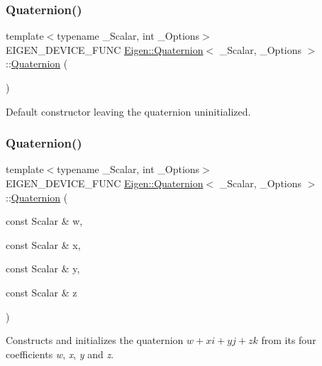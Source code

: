 \subsubsection{\texorpdfstring{Quaternion()}{Quaternion()}\hspace{0.1cm}{\footnotesize\ttfamily [1/7]}}
{\footnotesize\ttfamily template$<$typename \+\_\+\+Scalar, int \+\_\+\+Options$>$ \\
E\+I\+G\+E\+N\+\_\+\+D\+E\+V\+I\+C\+E\+\_\+\+F\+U\+NC \mbox{\hyperlink{class_eigen_1_1_quaternion}{Eigen\+::\+Quaternion}}$<$ \+\_\+\+Scalar, \+\_\+\+Options $>$\+::\mbox{\hyperlink{class_eigen_1_1_quaternion}{Quaternion}} (\begin{DoxyParamCaption}{ }\end{DoxyParamCaption})\hspace{0.3cm}{\ttfamily [inline]}}

Default constructor leaving the quaternion uninitialized. \mbox{\label{class_eigen_1_1_quaternion_a90c179492cd3ca296c85815e20773d60}} 
\subsubsection{\texorpdfstring{Quaternion()}{Quaternion()}\hspace{0.1cm}{\footnotesize\ttfamily [2/7]}}
{\footnotesize\ttfamily template$<$typename \+\_\+\+Scalar, int \+\_\+\+Options$>$ \\
E\+I\+G\+E\+N\+\_\+\+D\+E\+V\+I\+C\+E\+\_\+\+F\+U\+NC \mbox{\hyperlink{class_eigen_1_1_quaternion}{Eigen\+::\+Quaternion}}$<$ \+\_\+\+Scalar, \+\_\+\+Options $>$\+::\mbox{\hyperlink{class_eigen_1_1_quaternion}{Quaternion}} (\begin{DoxyParamCaption}\item[{const Scalar \&}]{w,  }\item[{const Scalar \&}]{x,  }\item[{const Scalar \&}]{y,  }\item[{const Scalar \&}]{z }\end{DoxyParamCaption})\hspace{0.3cm}{\ttfamily [inline]}}

Constructs and initializes the quaternion $ w+xi+yj+zk $ from its four coefficients {\itshape w}, {\itshape x}, {\itshape y} and {\itshape z}.

